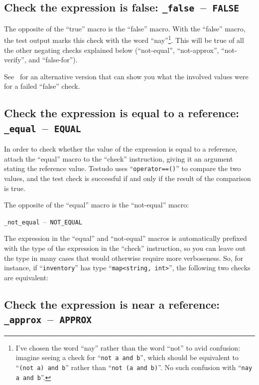 \documentclass[twoside, a4paper, article]{memoir}
\newcommand*\testudocolor{\color{red!80!blue}}
\newcommand*\testudo[1]{\texttt{\testudocolor{}#1}}
\newcommand*\testudopair[2]{\testudo{#1}~--~\testudo{#2}}
\newcommand\subsectiontestudopair[3]{%
  \subsection[#1]{#1: \testudopair{#2}{#3}}}
\providecommand\typesetexample[1]{%
}
\begin{document}
\subsectiontestudopair{Check the expression is false}{\_false}{FALSE}
\label{sec:check-expression-false}

The opposite of the ``true'' macro is the ``false'' macro.  With the ``false''
macro, the test output marks this check with the word ``nay''\footnote{I've
  chosen the word ``nay'' rather than the word ``not'' to avid confusion:
  imagine seeing a check for ``\texttt{not a and b}'', which should be
  equivalent to ``\texttt{(not a) and b}'' rather than ``\texttt{not (a and
    b)}''.  No such confusion with ``\texttt{nay a and b}''.}.  This will be
true of all the other negating checks explained below (``not-equal'',
``not-approx'', ``not-verify'', and ``false-for'').

\typesetexample{check-false}

See~ for an alternative version that can
show you what the involved values were for a failed ``false'' check.

\subsectiontestudopair{Check the expression is equal to a reference}%
  {\_equal}{EQUAL}
\label{sec:check-expression-equal-reference}

In order to check whether the value of the expression is equal to a reference,
attach the ``equal'' macro to the ``check'' instruction, giving it an argument
stating the reference value.  Testudo uses ``\texttt{operator==()}'' to
compare the two values, and the test check is successful if and only if the
result of the comparison is true.

\typesetexample{check-equal}

The opposite of the ``equal'' macro is the ``not-equal'' macro:
\begin{center}
  \testudopair{\_not\_equal}{NOT\_EQUAL}
\end{center}

The expression in the ``equal'' and ``not-equal'' macros is automatically
prefixed with the type of the expression in the ``check'' instruction, so you
can leave out the type in many cases that would otherwise require more
verboseness.  So, for instance, if ``\texttt{inventory}'' has type
``\texttt{map<string, int>}'', the following two checks are equivalent:

\typesetexample{check-equal-automatic-type}


\subsectiontestudopair{Check the expression is near a reference}%
  {\_approx}{APPROX}
\label{sec:check-expression-near-reference}
\end{document}
